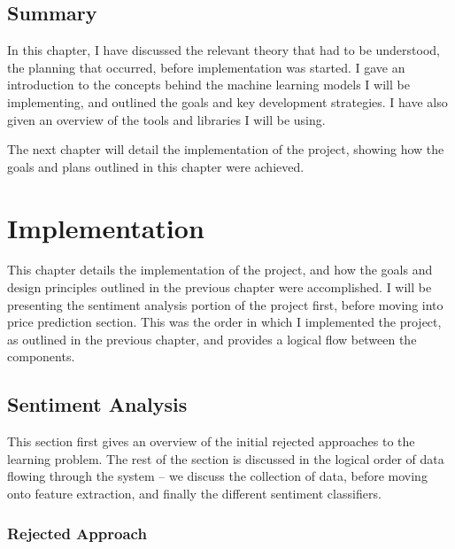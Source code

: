 \documentclass[12pt,a4paper,twoside,openright]{report}
\begin{document}
\section{Summary}
\label{sec:prepSumm}

In this chapter, I have discussed the relevant theory that had to be understood, the planning
that occurred, before implementation was started. I gave an introduction to the concepts
behind the machine learning models I will be implementing, and outlined the goals and
key development strategies. I have also given an overview of the tools and libraries I
will be using.

The next chapter will detail the implementation of the project, showing how the goals and
plans outlined in this chapter were achieved.

\chapter{Implementation}
\label{sec:imp}

This chapter details the implementation of the project, and how the goals and
design principles outlined in the previous chapter were accomplished. I will be
presenting the sentiment analysis portion of the project first, before moving into price
prediction section. This was the order in which I implemented the project, as outlined
in the previous chapter, and provides a logical flow between the components.


\section{Sentiment Analysis}
\label{sec:impSenti}
This section first gives an overview of the initial rejected approaches to the
learning problem. The rest of the section is discussed in the logical order of data flowing 
through the system --
we discuss the collection of data, before
moving onto feature extraction, and finally the different sentiment classifiers.

\subsection{Rejected Approach}
\label{sec:impFailed}
\end{document}
